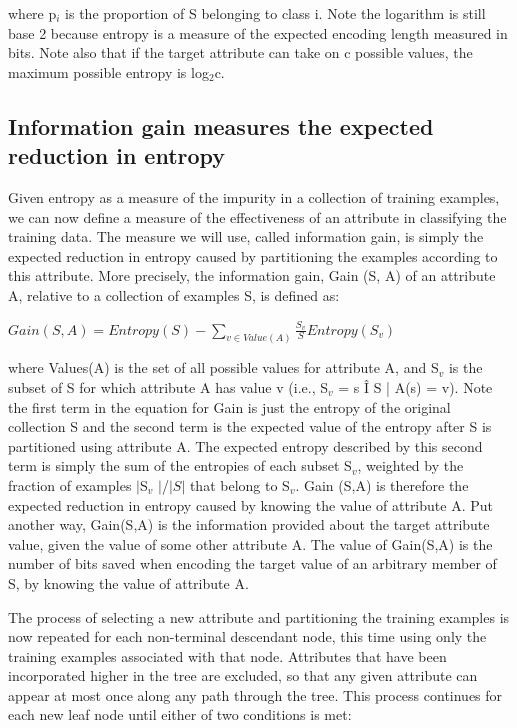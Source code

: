 \documentclass[12pt]{report}
\begin{document}
where p$_{i}$ is the proportion of S belonging to class i. Note the logarithm is still base 2 because entropy is a measure of the expected encoding length measured in bits. Note also that if the target attribute can take on c possible values, the maximum possible entropy is log$_{2}$c. 

\subsection{Information gain measures the expected reduction in entropy}
Given entropy as a measure of the impurity in a collection of training examples, we can now define a measure of the effectiveness of an attribute in classifying the training data. The measure we will use, called information gain, is simply the expected reduction in entropy caused by partitioning the examples according to this attribute. More precisely, the information gain, Gain (S, A) of an attribute A, relative to a collection of examples S, is defined as:

\begin{math}
Gain(S, A) = Entropy(S) - \sum_{v \in Value(A)} \frac{S_{v}}{S} Entropy(S_{v})
\end{math}

where Values(A) is the set of all possible values for attribute A, and S$_{v}$ is the subset of S for which attribute A has value v (i.e., S$_{v}$ = {s Î S | A(s) = v}). Note the first term in the equation for Gain is just the entropy of the original collection S and the second term is the expected value of the entropy after S is partitioned using attribute A. The expected entropy described by this second term is simply the sum of the entropies of each subset S$_{v}$, weighted by the fraction of examples $|$S$_{v}$ $|$/$|S|$ that belong to S$_{v}$. Gain (S,A) is therefore the expected reduction in entropy caused by knowing the value of attribute A. Put another way, Gain(S,A) is the information provided about the target attribute value, given the value of some other attribute A. The value of Gain(S,A) is the number of bits saved when encoding the target value of an arbitrary member of S, by knowing the value of attribute A.

The process of selecting a new attribute and partitioning the training examples is now repeated for each non-terminal descendant node, this time using only the training examples associated with that node. Attributes that have been incorporated higher in the tree are excluded, so that any given attribute can appear at most once along any path through the tree. This process continues for each new leaf node until either of two conditions is met:
\end{document}
